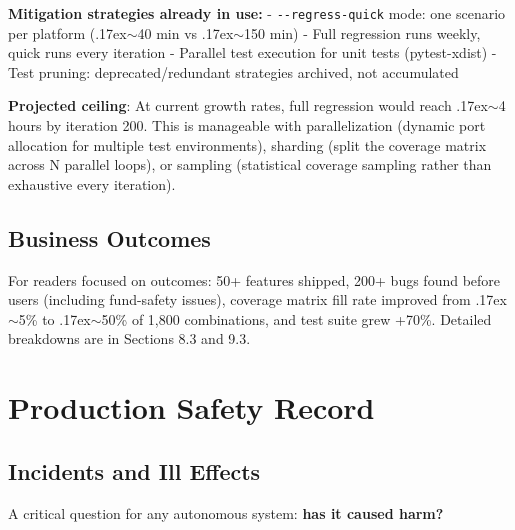\documentclass[11pt,a4paper]{article}
\newcommand{\roughly}{{\textraisebox{.17ex}{$\scriptstyle\sim$}}}
\newcommand{\textraisebox}[2]{\leavevmode\raise#1\hbox{#2}}
\begin{document}
\textbf{Mitigation strategies already in use:} - \texttt{-\/-regress-quick} mode: one scenario per platform (\roughly40 min vs \roughly150 min) - Full regression runs weekly, quick runs every iteration - Parallel test execution for unit tests (pytest-xdist) - Test pruning: deprecated/redundant strategies archived, not accumulated

\textbf{Projected ceiling}: At current growth rates, full regression would reach \roughly4 hours by iteration 200. This is manageable with parallelization (dynamic port allocation for multiple test environments), sharding (split the coverage matrix across N parallel loops), or sampling (statistical coverage sampling rather than exhaustive every iteration).

\subsection{Business Outcomes}\label{sec:business-outcomes}

For readers focused on outcomes: 50+ features shipped, 200+ bugs found before users (including fund-safety issues), coverage matrix fill rate improved from \roughly5\% to \roughly50\% of 1,800 combinations, and test suite grew +70\%. Detailed breakdowns are in Sections 8.3 and 9.3.


\section{Production Safety Record}\label{sec:production-safety-record}

\subsection{Incidents and Ill Effects}\label{sec:incidents-and-ill-effects}

A critical question for any autonomous system: \textbf{has it caused harm?}
\end{document}
